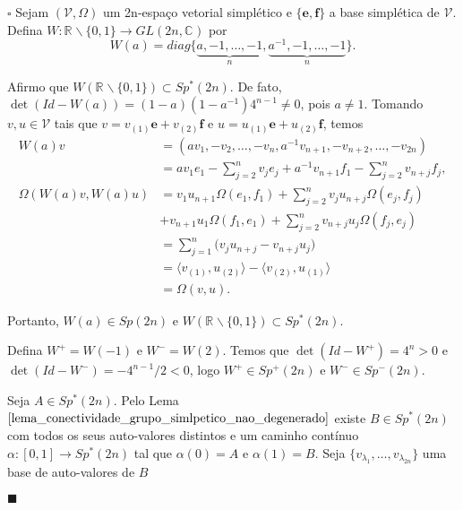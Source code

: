 \documentclass[12pt]{book}
\newenvironment{prova}[1]{$\square$ #1}{\hfill$\blacksquare$}
\newcommand{\bigparenteses}[1]{\Big( #1 \Big) }
\newcommand{\complementar}[2]{#1 \backslash #2}
\newcommand{\complexificado}[1]{\mathcal{#1}}
\newcommand{\complexo}[1]{\mathbb{C}^{#1}}
\newcommand{\formaSimpleticaExtendida}[2]{\Omega(#1, #2)}
\newcommand{\generalgroup}[2]{GL(#1, #2)}
\newcommand{\generalgroupcomplexo}[1]{\generalgroup{#1}{\complexo{}}}
\newcommand{\gruposimpletico}[1]{Sp(#1)}
\newcommand{\gruposimpleticonaodegenerado}[1]{Sp^{#1}(2n)}
\newcommand{\produtointerno}[2]{\langle #1, #2 \rangle}
\newcommand{\real}[1]{\mathbb{R}^{#1}}
\newcommand{\reta}{\real{}}
\begin{document}
	\begin{prova}
		Sejam $(\complexificado{V}, \Omega)$ um 2n-espaço vetorial simplético e $\{\textbf{e}, \textbf{f}\}$ a base simplética de $\complexificado{V}$. Defina $W: \complementar{\reta}{\{0,1\}} \to \generalgroupcomplexo{2n}$ por
		$$
		W(a) = diag\{\underbrace{a, -1, \dots, -1}_{n}, \underbrace{a^{-1}, -1, \dots , -1}_{n}\}.
		$$
		
		Afirmo que $W(\complementar{\reta}{\{0,1\}}) \subset \gruposimpleticonaodegenerado{*}$. De fato, $\det(Id - W(a)) = (1-a)(1-a^{-1})4^{n-1} \neq 0$, pois $a\neq 1$. Tomando $v,u \in \complexificado{V}$ tais que $v=v_{(1)}\textbf{e}+ v_{(2)}\textbf{f}$ e $u=u_{(1)}\textbf{e}+ u_{(2)}\textbf{f}$, temos 
		$$
		\begin{aligned}	
		W(a)v &= (av_{1}, -v_{2}, \dots, -v_{n}, a^{-1}v_{n+1}, -v_{n+2}, \dots, -v_{2n})
		\\
		&= av_{1}e_{1}  -\sum_{j=2}^{n} v_{j}e_{j} + a^{-1}v_{n+1}f_{1} -\sum_{j=2}^{n} v_{n+j}f_{j},
		\\
		\formaSimpleticaExtendida{W(a)v}{W(a)u} 
		&=v_{1}u_{n+1}\formaSimpleticaExtendida{e_{1}}{f_{1}} + \sum_{j=2}^{n}v_{j}u_{n+j}\formaSimpleticaExtendida{e_{j}}{f_{j}}
		\\
		&+v_{n+1}u_{1}\formaSimpleticaExtendida{f_{1}}{e_{1}} + \sum_{j=2}^{n} v_{n+j}u_{j}\formaSimpleticaExtendida{f_{j}}{e_{j}}
		\\
		&=\sum_{j=1}^{n}\bigparenteses{v_{j}u_{n+j} - 	v_{n+j}u_{j}}
		\\
		&= \produtointerno{v_{(1)}}{u_{(2)}} - \produtointerno{v_{(2)}}{u_{(1)}}
		\\
		&= \formaSimpleticaExtendida{v}{u}.
		\end{aligned}
		$$ 
		
		Portanto, $W(a) \in \gruposimpletico{2n}$ e $W(\complementar{\reta}{\{0,1\}}) \subset \gruposimpleticonaodegenerado{*}$.
		
		Defina $W^{+} = W(-1)$ e $W^{-} = W(2)$. Temos que $\det(Id - W^{+}) = 4^{n}>0$  e $\det(Id - W^{-}) = -4^{n-1}/2 <0$, logo $W^{+}\in \gruposimpleticonaodegenerado{+}$ e $W^{-}\in \gruposimpleticonaodegenerado{-}$. 
		
		Seja $A \in \gruposimpleticonaodegenerado{*}$. Pelo Lema $\ref{lema_conectividade_grupo_simlpetico_nao_degenerado}$ existe $B \in \gruposimpleticonaodegenerado{*}$ com todos os seus auto-valores distintos  e um caminho contínuo $\alpha:[0,1] \to \gruposimpleticonaodegenerado{*}$ tal que $\alpha(0)=A$ e $\alpha(1) = B$. Seja $\{v_{\lambda_{1}}, \dots , v_{\lambda_{2n}} \}$ uma base de auto-valores de $B$ 
		

\end{prova}
\end{document}

